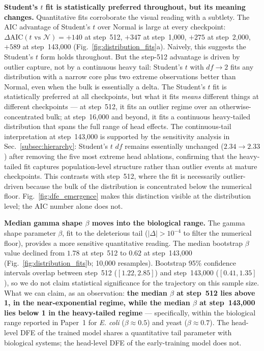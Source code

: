 \documentclass{article}
\begin{document}
\textbf{Student's $t$ fit is statistically preferred throughout, but its meaning changes.} Quantitative fits corroborate the visual reading with a subtlety. The AIC advantage of Student's $t$ over Normal is large at every checkpoint: $\Delta\text{AIC}(t \text{ vs } \mathcal{N}) = +140$ at step~512, $+347$ at step~1,000, $+275$ at step~2,000, $+589$ at step~143,000 (Fig.~\ref{fig:distribution_fits}a). Naively, this suggests the Student's $t$ form holds throughout. But the step-512 advantage is driven by outlier capture, not by a continuous heavy tail: Student's $t$ with $df \to 2$ fits any distribution with a narrow core plus two extreme observations better than Normal, even when the bulk is essentially a delta. The Student's $t$ fit is statistically preferred at all checkpoints, but what it fits \emph{means} different things at different checkpoints --- at step~512, it fits an outlier regime over an otherwise-concentrated bulk; at step~16,000 and beyond, it fits a continuous heavy-tailed distribution that spans the full range of head effects. The continuous-tail interpretation at step~143,000 is supported by the sensitivity analysis in Sec.~\ref{subsec:hierarchy}: Student's $t$ $df$ remains essentially unchanged ($2.34 \to 2.33$) after removing the five most extreme head ablations, confirming that the heavy-tailed fit captures population-level structure rather than outlier events at mature checkpoints. This contrasts with step~512, where the fit is necessarily outlier-driven because the bulk of the distribution is concentrated below the numerical floor. Fig.~\ref{fig:dfe_emergence} makes this distinction visible at the distribution level; the AIC number alone does not.

\textbf{Median gamma shape $\beta$ moves into the biological range.} The gamma shape parameter $\beta$, fit to the deleterious tail ($|\Delta| > 10^{-4}$ to filter the numerical floor), provides a more sensitive quantitative reading. The median bootstrap $\beta$ value declined from $1.78$ at step~512 to $0.62$ at step~143{,}000 (Fig.~\ref{fig:distribution_fits}b; 10{,}000 resamples). Bootstrap 95\% confidence intervals overlap between step~512 ($[1.22, 2.85]$) and step~143{,}000 ($[0.41, 1.35]$), so we do not claim statistical significance for the trajectory on this sample size. What we can claim, as an observation: \textbf{the median $\beta$ at step~512 lies above 1, in the near-exponential regime, while the median $\beta$ at step~143{,}000 lies below 1 in the heavy-tailed regime} --- specifically, within the biological range reported in Paper~1 for \emph{E. coli} ($\beta \approx 0.5$) and yeast ($\beta \approx 0.7$). The head-level DFE of the trained model shares a quantitative tail parameter with biological systems; the head-level DFE of the early-training model does not.
\end{document}
